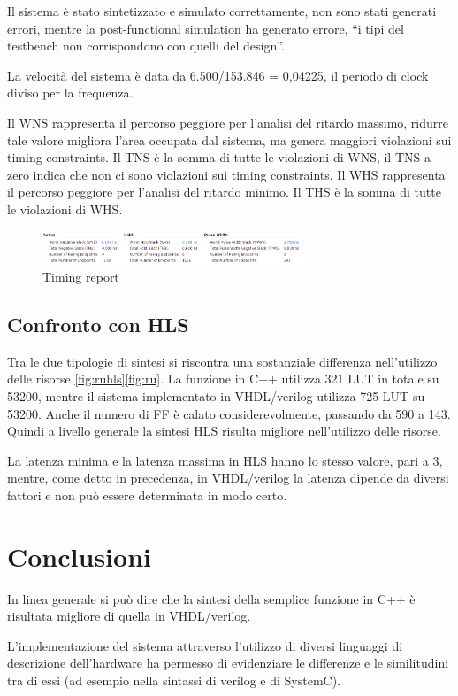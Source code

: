 \documentclass[]{IEEEtran}
\begin{document}
Il sistema è stato sintetizzato e simulato correttamente, non sono stati generati errori, mentre la post-functional simulation ha generato errore, “i tipi del testbench non corrispondono con quelli del design”.

La velocità del sistema è data da 6.500/153.846 = 0,04225, il periodo di clock diviso per la frequenza.

Il WNS rappresenta il percorso peggiore per l’analisi del ritardo massimo, ridurre tale valore migliora l’area occupata dal sistema, ma genera maggiori violazioni sui timing constraints. Il TNS è la somma di tutte le violazioni di WNS, il TNS a zero indica che non ci sono violazioni sui timing constraints. Il WHS rappresenta il percorso peggiore per l’analisi del ritardo minimo. Il THS è la somma di tutte le violazioni di WHS.

\begin{figure}[bt]
	\centering
	\includegraphics[width=0.7\textwidth]{figures/timing_report.png}
	\caption{Timing report}
	\label{fig:tr}
\end{figure}

\subsection{Confronto con HLS}
Tra le due tipologie di sintesi si riscontra una sostanziale differenza nell’utilizzo delle risorse \ref{fig:ruhls}\ref{fig:ru}. La funzione in C++ utilizza 321 LUT in totale su 53200, mentre il sistema implementato in VHDL/verilog utilizza 725 LUT su 53200. Anche il numero di FF è calato considerevolmente, passando da 590 a 143. Quindi a livello generale la sintesi HLS risulta migliore nell’utilizzo delle risorse.

La latenza minima e la latenza massima in HLS hanno lo stesso valore, pari a 3, mentre, come detto in precedenza, in VHDL/verilog la latenza dipende da diversi fattori e non può essere determinata in modo certo.

\section{Conclusioni}
In linea generale si può dire che la sintesi della semplice funzione in C++ è risultata migliore di quella in VHDL/verilog.

L'implementazione del sistema attraverso l'utilizzo di diversi linguaggi di descrizione dell'hardware ha permesso di evidenziare le differenze e le similitudini tra di essi (ad esempio nella sintassi di verilog e di SystemC). 
\end{document}
